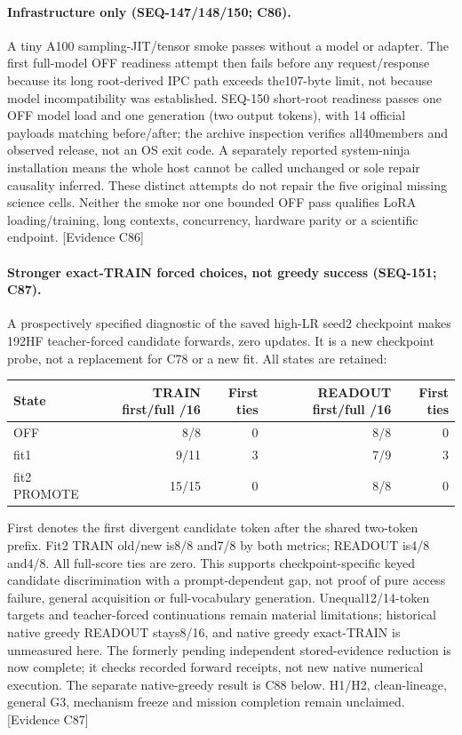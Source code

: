 \documentclass{article}
\begin{document}
\paragraph{Infrastructure only (SEQ-147/148/150; C86).}
A tiny A100 sampling-JIT/tensor smoke passes without a model or adapter. The first
full-model OFF readiness attempt then fails before any request/response because
its long root-derived IPC path exceeds the107-byte limit, not because model
incompatibility was established. SEQ-150 short-root readiness passes one OFF
model load and one generation (two output tokens), with 14 official payloads
matching before/after; the archive inspection verifies all40members and observed
release, not an OS exit code. A separately reported system-ninja installation
means the whole host cannot be called unchanged or sole repair causality inferred.
These distinct attempts do not repair the five original missing science cells.
Neither the smoke nor one bounded OFF pass qualifies LoRA loading/training,
long contexts, concurrency, hardware parity or a scientific endpoint.
\textsf{[Evidence C86]}

\paragraph{Stronger exact-TRAIN forced choices, not greedy success (SEQ-151; C87).}
A prospectively specified diagnostic of the saved high-LR seed2 checkpoint makes
192HF teacher-forced candidate forwards, zero updates. It is a new checkpoint
probe, not a replacement for C78 or a new fit. All states are retained:
\begin{center}\small
\begin{tabular}{lrrrr}
\toprule
State & TRAIN first/full /16 & First ties & READOUT first/full /16 & First ties \\
\midrule
OFF & 8/8 & 0 & 8/8 & 0 \\
fit1 & 9/11 & 3 & 7/9 & 3 \\
fit2 PROMOTE & 15/15 & 0 & 8/8 & 0 \\
\bottomrule
\end{tabular}
\end{center}
First denotes the first divergent candidate token after the shared two-token prefix.
Fit2 TRAIN old/new is8/8 and7/8 by both metrics; READOUT is4/8 and4/8.
All full-score ties are zero. This supports checkpoint-specific keyed candidate
discrimination with a prompt-dependent gap, not proof of pure access failure,
general acquisition or full-vocabulary generation. Unequal12/14-token targets
and teacher-forced continuations remain material limitations; historical native
greedy READOUT stays8/16, and native greedy exact-TRAIN is unmeasured here.
The formerly pending independent stored-evidence reduction is now complete;
it checks recorded forward receipts, not new native numerical execution.
The separate native-greedy result is C88 below. H1/H2, clean-lineage, general G3, mechanism freeze and
mission completion remain unclaimed. \textsf{[Evidence C87]}
\end{document}
